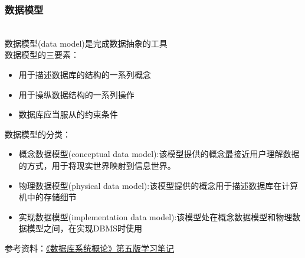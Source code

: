 \subsubsection{数据模型}\\
数据模型(data model)是完成数据抽象的工具 \\
数据模型的三要素：
\begin{itemize}
\item 用于描述数据库的结构的一系列概念
\item 用于操纵数据结构的一系列操作
\item 数据库应当服从的约束条件
\end{itemize}
数据模型的分类：
\begin{itemize}
\item 概念数据模型(conceptual data model):该模型提供的概念最接近用户理解数据的方式，用于将现实世界映射到信息世界。
\item 物理数据模型(physical data model):该模型提供的概念用于描述数据库在计算机中的存储细节
\item 实现数据模型(implementation data model):该模型处在概念数据模型和物理数据模型之间，在实现DBMS时使用
\end{itemize}

参考资料：\href{http://t.csdn.cn/SFcuR}{《数据库系统概论》第五版学习笔记}

